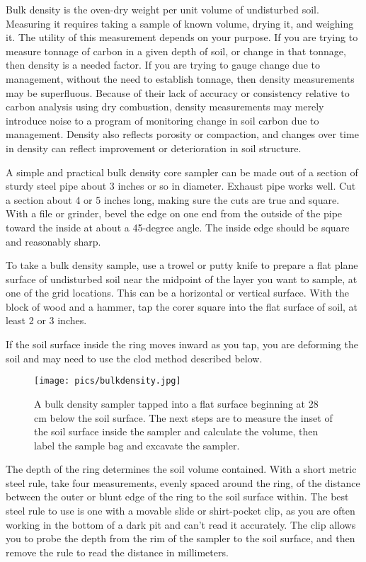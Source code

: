 \documentclass[11pt,letterpaper,oneside,onecolumn]{memoir}
\begin{document}
Bulk density is the oven-dry weight per unit volume of undisturbed soil. Measuring it requires taking a sample of known volume, drying it, and weighing it. The utility of this measurement depends on your purpose. If you are trying to measure tonnage of carbon in a given depth of soil, or change in that tonnage, then density is a needed factor. If you are trying to gauge change due to management, without the need to establish tonnage, then density measurements may be superfluous. Because of their lack of accuracy or consistency relative to carbon analysis using dry combustion, density measurements may merely introduce noise to a program of monitoring change in soil carbon due to management. Density also reflects porosity or compaction, and changes over time in density can reflect improvement or deterioration in soil structure.

A simple and practical bulk density core sampler can be made out of a section of sturdy steel pipe about 3 inches or so in diameter. Exhaust pipe works well. Cut a section about 4 or 5 inches long, making sure the cuts are true and square. With a file or grinder, bevel the edge on one end from the outside of the pipe toward the inside at about a 45-degree angle. The inside edge should be square and reasonably sharp.

To take a bulk density sample, use a trowel or putty knife to prepare a flat plane surface of undisturbed soil near the midpoint of the layer you want to sample, at one of the grid locations. This can be a horizontal or vertical surface. With the block of wood and a hammer, tap the corer square into the flat surface of soil, at least 2 or 3 inches.

If the soil surface inside the ring moves inward as you tap, you are deforming the soil and may need to use the clod method described below.

\begin{figure}
\centering
\texttt{[image: pics/bulkdensity.jpg]}
\caption{A bulk density sampler tapped into a flat surface beginning at 28 cm below the soil surface. The next steps are to measure the inset of the soil surface inside the sampler and calculate the volume, then label the sample bag and excavate the sampler.}
\end{figure}

The depth of the ring determines the soil volume contained. With a short metric steel rule, take four measurements, evenly spaced around the ring, of the distance between the outer or blunt edge of the ring to the soil surface within. The best steel rule to use is one with a movable slide or shirt-pocket clip, as you are often working in the bottom of a dark pit and can't read it accurately. The clip allows you to probe the depth from the rim of the sampler to the soil surface, and then remove the rule to read the distance in millimeters.
\end{document}
